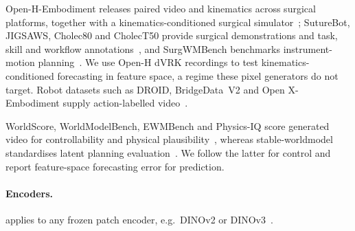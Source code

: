 Open-H-Embodiment releases paired video and kinematics across surgical platforms,
together with a kinematics-conditioned surgical simulator~\citep{openh2026embodiment}; SutureBot, JIGSAWS, Cholec80 and
CholecT50 provide surgical demonstrations and task, skill and workflow
annotations~\citep{haworth2025suturebot,gao2014jigsaws,twinanda2017endonet,nwoye2022rendezvous}, and SurgWMBench
benchmarks instrument-motion planning~\citep{liu2026surgwmbench}. We use Open-H dVRK recordings to test
kinematics-conditioned forecasting in feature space, a regime these pixel generators do not target. Robot datasets such
as DROID, BridgeData~V2 and Open X-Embodiment supply action-labelled video~\citep{khazatsky2024droid,walke2023bridgedata,oneill2024openx}.

WorldScore, WorldModelBench, EWMBench and Physics-IQ score generated video for controllability and physical
plausibility~\citep{duan2025worldscore,li2025worldmodelbench,yue2025ewmbench,motamed2026physicsiq}, whereas
stable-worldmodel standardises latent planning evaluation~\citep{maes2026stable}. We follow the latter for control and
report feature-space forecasting error for prediction.
\paragraph{Encoders.} \ours{} applies to any frozen patch encoder, e.g.\ DINOv2 or DINOv3~\citep{oquab2023dinov2,simeoni2025dinov3}.
